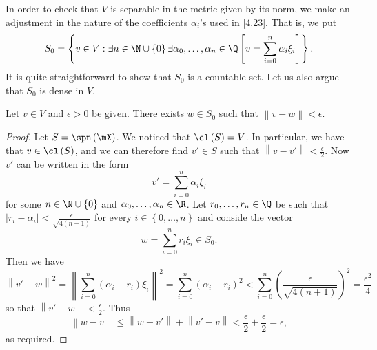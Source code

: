 \documentclass[pmath450]{subfiles}
\begin{document}
    In order to check that $V$ is separable in the metric given by its norm, we make an adjustment in the nature of the coefficients $\alpha_i$'s used in [4.23]. That is, we put
    \begin{equation*}
        S_0 = \left\lbrace v\in V: \exists n\in\N\cup\left\lbrace 0 \right\rbrace\exists\alpha_0,\ldots,\alpha_n\in\Q\left[ v=\sum^{n}_{i=0}\alpha_i\xi_i \right] \right\rbrace.
    \end{equation*}
    It is quite straightforward to show that $S_0$ is a countable set. Let us also argue that $S_0$ is dense in $V$.

    \begin{lemma}{}
        Let $v\in V$ and $\epsilon>0$ be given. There exists $w\in S_0$ such that $\left\lVert v-w\right\rVert<\epsilon$.
    \end{lemma}

    \begin{proof}
        Let $S=\spn\left( \mX \right)$. We noticed that $\cl\left( S \right)=V$. In particular, we have that $v\in\cl\left( S \right)$, and we can therefore find $v'\in S$ such that $\left\lVert v-v'\right\rVert< \frac{\epsilon}{2}$. Now $v'$ can be written in the form
        \begin{equation*}
            v' = \sum^{n}_{i=0}\alpha_i\xi_i
        \end{equation*}
        for some $n\in\N\cup\left\lbrace 0 \right\rbrace$ and $\alpha_0,\ldots,\alpha_n\in\R$. Let $r_0,\ldots,r_n\in\Q$ be such that $\left| r_i-\alpha_i \right| < \frac{\epsilon}{\sqrt{4\left( n+1 \right)}}$ for every $i\in\left\lbrace 0,\ldots,n \right\rbrace$ and conside the vector
        \begin{equation*}
            w = \sum^{n}_{i=0}r_i\xi_i\in S_0.
        \end{equation*}
        Then we have
        \begin{equation*}
            \left\lVert v'-w\right\rVert^{2} = \left\lVert \sum^{n}_{i=0}\left( \alpha_i-r_i \right)\xi_i\right\rVert^{2} = \sum^{n}_{i=0} \left( \alpha_i-r_i \right)^{2} < \sum^{n}_{i=0} \left( \frac{\epsilon}{\sqrt{4\left( n+1 \right)}} \right)^{2} = \frac{\epsilon^{2}}{4}
        \end{equation*}
        so that $\left\lVert v'-w\right\rVert<\frac{\epsilon}{2}$. Thus
        \begin{equation*}
            \left\lVert w-v\right\rVert\leq \left\lVert w-v'\right\rVert+\left\lVert v'-v\right\rVert < \frac{\epsilon}{2} + \frac{\epsilon}{2} = \epsilon,
        \end{equation*}
        as required.
    \end{proof}
\end{document}
